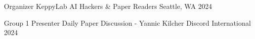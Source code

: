 

\begin{cvhonors}

  \cvhonor
    {Organizer} %
    {KeppyLab AI Hackers \& Paper Readers} %
    {Seattle, WA} %
    {2024} %

  \cvhonor
    {Group 1 Presenter} %
    {Daily Paper Discussion - Yannic Kilcher Discord} %
    {International} %
    {2024} %

\end{cvhonors}
